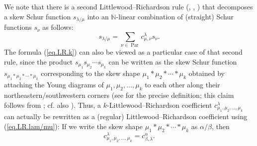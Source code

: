 \documentclass[numbers=enddot,12pt,final,onecolumn,notitlepage]{scrartcl}%
\theoremstyle{definition}
\let\sumnonlimits\sum
\renewcommand{\sum}{\sumnonlimits\limits}
\begin{document}
We note that there is a second Littlewood--Richardson rule (\cite[Theorem
4.9.2]{Sagan-SG}, \cite[(2.6.4)]{GriRei}, \cite[Theorem 10.40]{Egge19}) that
decomposes a skew Schur function $s_{\lambda/\mu}$ into an $\mathbb{N}$-linear
combination of (straight) Schur functions $s_{\nu}$ as follows:%
\begin{equation}
s_{\lambda/\mu}=\sum_{\nu\in\operatorname*{Par}}c_{\mu,\nu}^{\lambda}s_{\nu}.
\label{eq.LR.lam/mu}%
\end{equation}
The formula (\ref{eq.LR.k}) can also be viewed as a particular case of that
second rule, since the product $s_{\mu_{1}}s_{\mu_{2}}\cdots s_{\mu_{k}}$ can
be written as the skew Schur function $s_{\mu_{1}\ast\mu_{2}\ast\cdots\ast
\mu_{k}}$ corresponding to the skew shape $\mu_{1}\ast\mu_{2}\ast\cdots\ast
\mu_{k}$ obtained by attaching the Young diagrams of $\mu_{1},\mu_{2}%
,\ldots,\mu_{k}$ to each other along their northeastern/southwestern corners
(see \cite[\S 1]{RemmelWhitney} for the precise definition; this claim follows
from \cite[Proposition 5.9]{Egge19}; cf. also \cite[Figure 7.2]{Stanley-EC2}).
Thus, a $k$-Littlewood--Richardson coefficient $c_{\mu_{1},\mu_{2},\ldots
,\mu_{k}}^{\lambda}$ can actually be rewritten as a (regular)
Littlewood--Richardson coefficient using (\ref{eq.LR.lam/mu}): If we write the
skew shape $\mu_{1}\ast\mu_{2}\ast\cdots\ast\mu_{k}$ as $\alpha/\beta$, then
\begin{equation}
c_{\mu_{1},\mu_{2},\ldots,\mu_{k}}^{\lambda}=c_{\beta,\lambda}^{\alpha}.
\label{eq.LR.c=c}%
\end{equation}
\end{document}
